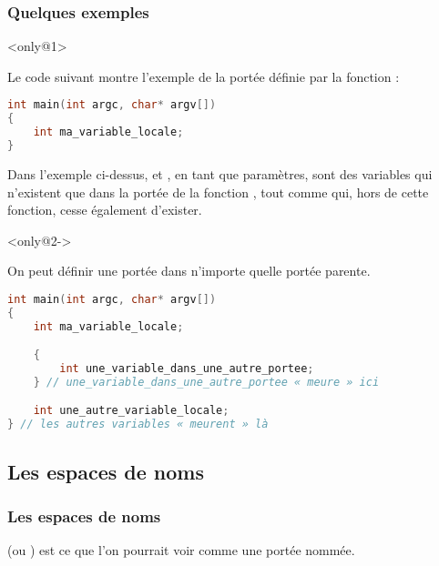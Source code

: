 \documentclass{cppcourses}
\begin{document}
\begin{frame}[fragile]

\frametitle{Quelques exemples}

\begin{example}<only@1>

Le code suivant montre l'exemple de la portée définie par la fonction  :

\begin{lstlisting}[language = c++]
int main(int argc, char* argv[])
{
    int ma_variable_locale;
}
\end{lstlisting}

Dans l'exemple ci-dessus,  et , en tant que paramètres, sont des variables qui n'existent que dans la portée de la fonction , tout comme  qui, hors de cette fonction, cesse également d'exister.

\end{example}

\begin{example}<only@2->

On peut définir une portée dans n'importe quelle portée parente.

\begin{lstlisting}[language = c++]
int main(int argc, char* argv[])
{
    int ma_variable_locale;

    {
        int une_variable_dans_une_autre_portee;
    } // une_variable_dans_une_autre_portee « meure » ici

    int une_autre_variable_locale;
} // les autres variables « meurent » là
\end{lstlisting}

\end{example}

\end{frame}

\subsection{Les espaces de noms}

\begin{frame}

\frametitle{Les espaces de noms}

\begin{definition}
 (ou ) est ce que l'on pourrait voir comme une portée nommée.
\end{definition}



\end{frame}
\end{document}

